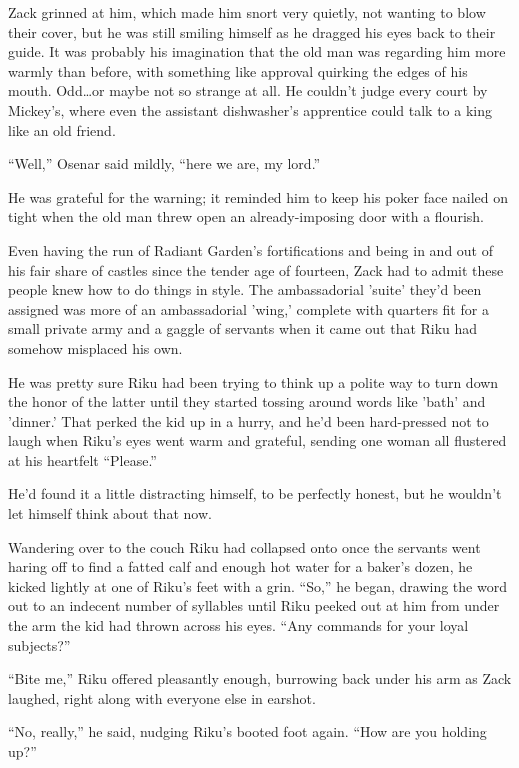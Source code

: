 Zack grinned at him, which made him snort very quietly, not wanting to blow their cover, but he was still smiling himself as he dragged his eyes back to their guide. It was probably his imagination that the old man was regarding him more warmly than before, with something like approval quirking the edges of his mouth. Odd\ldots or maybe not so strange at all. He couldn't judge every court by Mickey's, where even the assistant dishwasher's apprentice could talk to a king like an old friend.

``Well,'' Osenar said mildly, ``here we are, my lord.''

He was grateful for the warning; it reminded him to keep his poker face nailed on tight when the old man threw open an already-imposing door with a flourish.


\scenechange


Even having the run of Radiant Garden's fortifications and being in and out of his fair share of castles since the tender age of fourteen, Zack had to admit these people knew how to do things in style. The ambassadorial 'suite' they'd been assigned was more of an ambassadorial 'wing,' complete with quarters fit for a small private army and a gaggle of servants when it came out that Riku had somehow misplaced his own.

He was pretty sure Riku had been trying to think up a polite way to turn down the honor of the latter until they started tossing around words like 'bath' and 'dinner.' That perked the kid up in a hurry, and he'd been hard-pressed not to laugh when Riku's eyes went warm and grateful, sending one woman all flustered at his heartfelt ``Please.''

He'd found it a little distracting himself, to be perfectly honest, but he wouldn't let himself think about that now.

Wandering over to the couch Riku had collapsed onto once the servants went haring off to find a fatted calf and enough hot water for a baker's dozen, he kicked lightly at one of Riku's feet with a grin. ``So,'' he began, drawing the word out to an indecent number of syllables until Riku peeked out at him from under the arm the kid had thrown across his eyes. ``Any commands for your loyal subjects?''

``Bite me,'' Riku offered pleasantly enough, burrowing back under his arm as Zack laughed, right along with everyone else in earshot.

``No, really,'' he said, nudging Riku's booted foot again. ``How are you holding up?''

